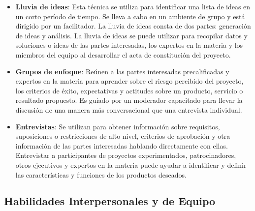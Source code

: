 \documentclass[letterpaper,12pt,openright,oneside]{article}
\theoremstyle{plain}
\begin{document}
\begin{itemize}
    \item \textbf{Lluvia de ideas}: Esta técnica se utiliza para identificar una lista de ideas en un corto período de tiempo. Se lleva a cabo en un ambiente de grupo y está dirigido por un facilitador. La lluvia de ideas consta de dos partes: generación de ideas y análisis. La lluvia de ideas se puede utilizar para recopilar datos y soluciones o ideas de las partes interesadas, los expertos en la materia y los miembros del equipo al desarrollar el acta de constitución del proyecto.
    \item \textbf{Grupos de enfoque}: Reúnen a las partes interesadas precalificadas y expertos en la materia para aprender sobre el riesgo percibido del proyecto, los criterios de éxito, expectativas y actitudes sobre un producto, servicio o resultado propuesto. Es guiado por un moderador capacitado para llevar la discusión de una manera más conversacional que una entrevista individual.
    \item \textbf{Entrevistas}: Se utilizan para obtener información sobre requisitos, suposiciones o restricciones de alto nivel, criterios de aprobación y otra información de las partes interesadas hablando directamente con ellas. Entrevistar a participantes de proyectos experimentados, patrocinadores, otros ejecutivos y expertos en la materia puede ayudar a identificar y definir las características y funciones de los productos deseados.
\end{itemize}
% 
% 
\subsection*{Habilidades Interpersonales y de Equipo}
\end{document}
